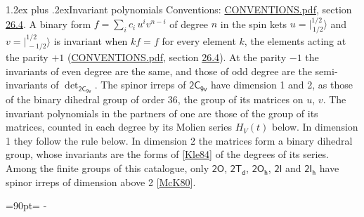 \documentclass[10pt,a4paper]{article}
\makeatletter
\renewcommand\section{\@startsection{section}{1}{\z@}{-3ex plus -1ex minus -.2ex}%
  {1.2ex plus .2ex}{\normalfont\large\sffamily\bfseries\color{parttitle}}}
\newcommand{\needspace}[1]{\par\penalty-100\begingroup\dimen0=#1\relax\dimen2=\pagegoal
  \advance\dimen2-\pagetotal\ifdim\dimen0>\dimen2\relax\ifdim\dimen2>0pt\vfil\break\fi\fi
  \endgroup}
\numberwithin{equation}{section}
\newcommand{\grp}[1]{\mathsf{#1}}
\newcommand{\jm}[2]{\bigl\lvert{}^{#1}_{\,#2}\bigr\rangle}
\makeatother
\begin{document}
\section{Invariant polynomials}\label{s:invariants}
Conventions: \href{../../CONVENTIONS.pdf}{CONVENTIONS.pdf}, section \href{../../CONVENTIONS.pdf\#conv.26.4}{26.4}.
\leavevmode\label{n:local.binary.form}A binary form $f = \sum_i c_i\, u^i v^{n-i}$ of degree $n$ in the spin kets $u = \jm{1/2}{1/2}$ and $v = \jm{1/2}{-1/2}$ is invariant when $k f = f$ for every element $k$, the elements acting at the parity $+1$ (\href{../../CONVENTIONS.pdf}{CONVENTIONS.pdf}, section \href{../../CONVENTIONS.pdf\#conv.26.4}{26.4}). At the parity $-1$ the invariants of even degree are the same, and those of odd degree are the semi-invariants of $\det_{\grp{2C_{9v}}}$.
The spinor irreps of $\grp{2C_{9v}}$ have dimension 1 and 2, as those of the binary dihedral group of order 36, the group of its matrices on $u$, $v$. \label{n:function.hilbert}The invariant polynomials in the partners of one are those of the group of its matrices, counted in each degree by its Molien series $H_V(t)$ below. In dimension 1 they follow the rule below. In dimension 2 the matrices form a binary dihedral group, whose invariants are the forms of [\href{../../../REFERENCES.pdf\#ref.Kle84}{Kle84}] of the degrees of its series. Among the finite groups of this catalogue, only $\grp{2O}$, $\grp{2T_{d}}$, $\grp{2O_{h}}$, $\grp{2I}$ and $\grp{2I_{h}}$ have spinor irreps of dimension above 2 [\href{../../../REFERENCES.pdf\#ref.McK80}{McK80}].
\needspace{90pt}
\end{document}
